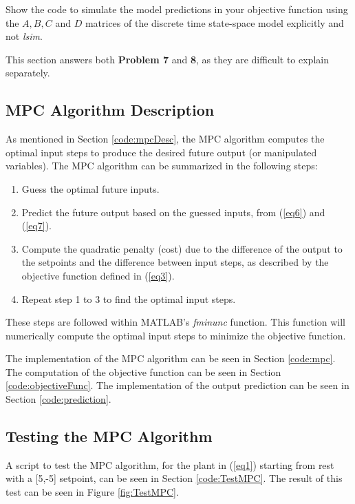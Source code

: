 \documentclass[12pt]{article}
\newenvironment{problem}[2][Problem]{\begin{trivlist}
		\item[\hskip \labelsep {\bfseries #1}\hskip \labelsep {\bfseries #2.}]}{\end{trivlist}}
\begin{document}
\begin{problem}{8} Show the code to simulate the model predictions in your objective function using the $ A, B, C $ and $ D $ matrices of the discrete time state-space model explicitly and not \textit{lsim}. \end{problem}

This section answers both \textbf{Problem 7} and \textbf{8}, as they are difficult to explain separately. 

\subsection{MPC Algorithm Description}

As mentioned in Section \ref{code:mpcDesc}, the MPC algorithm computes the optimal input steps to produce the desired future output (or manipulated variables). The MPC algorithm can be summarized in the following steps:
\begin{enumerate}
	\item Guess the optimal future inputs.
	\item Predict the future output based on the guessed inputs, from (\ref{eq6}) and (\ref{eq7}). 
	\item Compute the quadratic penalty (cost) due to the difference of the output to the setpoints and the difference between input steps, as described by the objective function defined in (\ref{eq3}).
	\item Repeat step 1 to 3 to find the optimal input steps.
\end{enumerate}

These steps are followed within MATLAB's \textit{fminunc} function. This function will numerically compute the optimal input steps to minimize the objective function.

The implementation of the MPC algorithm can be seen in Section \ref{code:mpc}. The computation of the objective function can be seen in Section \ref{code:objectiveFunc}. The implementation of the output prediction can be seen in Section \ref{code:prediction}.

\subsection{Testing the MPC Algorithm}

A script to test the MPC algorithm, for the plant in (\ref{eq1}) starting from rest with a [5,-5] setpoint, can be seen in Section \ref{code:TestMPC}. The result of this test can be seen in Figure \ref{fig:TestMPC}.
\end{document}
